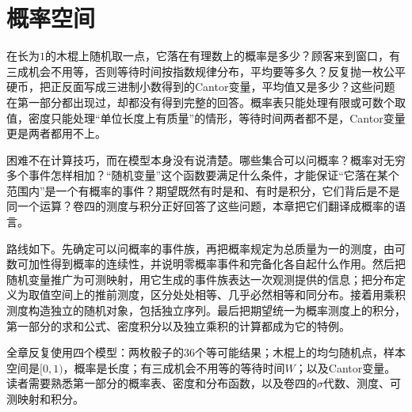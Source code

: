 \chapter{概率空间}
\label{chap:probability-spaces}

在长为$1$的木棍上随机取一点，它落在有理数上的概率是多少？顾客来到窗口，有三成机会不用等，否则等待时间按指数规律分布，平均要等多久？反复抛一枚公平硬币，把正反面写成三进制小数得到的Cantor变量，平均值又是多少？这些问题在第一部分都出现过，却都没有得到完整的回答。概率表只能处理有限或可数个取值，密度只能处理“单位长度上有质量”的情形，等待时间两者都不是，Cantor变量更是两者都用不上。

困难不在计算技巧，而在模型本身没有说清楚。哪些集合可以问概率？概率对无穷多个事件怎样相加？“随机变量”这个函数要满足什么条件，才能保证“它落在某个范围内”是一个有概率的事件？期望既然有时是和、有时是积分，它们背后是不是同一个运算？卷四的测度与积分正好回答了这些问题，本章把它们翻译成概率的语言。

路线如下。先确定可以问概率的事件族，再把概率规定为总质量为一的测度，由可数可加性得到概率的连续性，并说明零概率事件和完备化各自起什么作用。然后把随机变量推广为可测映射，用它生成的事件族表达一次观测提供的信息；把分布定义为取值空间上的推前测度，区分处处相等、几乎必然相等和同分布。接着用乘积测度构造独立的随机对象，包括独立序列。最后把期望统一为概率测度上的积分，第一部分的求和公式、密度积分以及独立乘积的计算都成为它的特例。

全章反复使用四个模型：两枚骰子的$36$个等可能结果；木棍上的均匀随机点，样本空间是$[0,1)$，概率是长度；有三成机会不用等的等待时间$W$；以及Cantor变量。读者需要熟悉第一部分的概率表、密度和分布函数，以及卷四的$\sigma$代数、测度、可测映射和积分。








